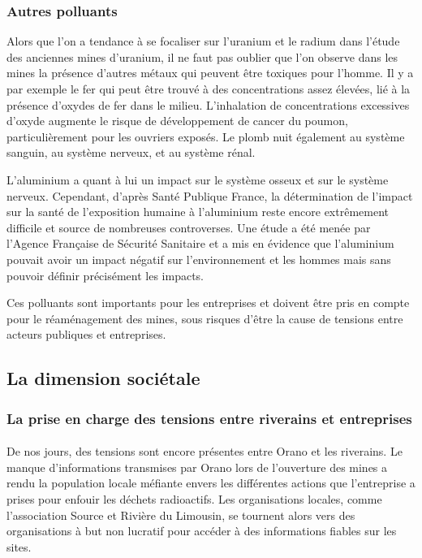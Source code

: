 \documentclass{article}
\begin{document}
\subsubsection{Autres polluants}

Alors que l’on a tendance à se focaliser sur l’uranium et le radium dans l’étude des anciennes mines d’uranium, il ne faut pas oublier que l’on observe dans les mines la présence d'autres métaux qui peuvent être toxiques pour l’homme. Il y a par exemple le fer qui peut être trouvé à des concentrations assez élevées, lié à la présence d'oxydes de fer dans le milieu. L'inhalation de concentrations excessives d'oxyde augmente le risque de développement de cancer du poumon, particulièrement pour les ouvriers exposés. Le plomb nuit également au système sanguin, au système nerveux, et au système rénal.

L’aluminium a quant à lui un impact sur le système osseux et sur le système nerveux. Cependant, d’après Santé Publique France, la détermination de l'impact sur la santé de l'exposition humaine à l'aluminium reste encore extrêmement difficile et source de nombreuses controverses. Une étude a été menée par l’Agence Française de Sécurité Sanitaire et a mis en évidence que l’aluminium pouvait avoir un impact négatif sur l’environnement et les hommes mais sans pouvoir définir précisément les impacts.

Ces polluants sont importants pour les entreprises et doivent être pris en compte pour le réaménagement des mines, sous risques d'être la cause de tensions entre acteurs publiques et entreprises.


\subsection{La dimension sociétale}
\subsubsection{La prise en charge des tensions entre riverains et entreprises}
\paragraph{} De nos jours, des tensions sont encore présentes entre Orano et les riverains. Le manque d’informations transmises par Orano lors de l’ouverture des mines a rendu la population locale méfiante envers les différentes actions que l’entreprise a prises pour enfouir les déchets radioactifs. Les organisations locales, comme l’association Source et Rivière du Limousin, se tournent alors vers des organisations à but non lucratif pour accéder à des informations fiables sur les sites. 
\end{document}
